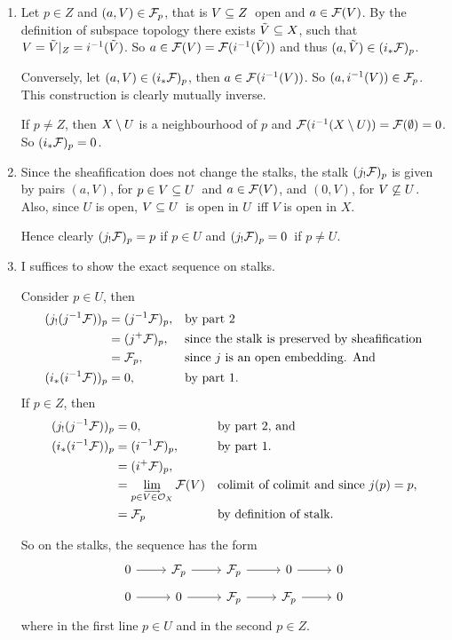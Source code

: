 \documentclass[a4paper,11pt,english]{article}
\begin{document}
\begin{exercise}[3]
\begin{enumerate}
\item 
Let $p \in Z$ and $(a,V) \in \mathcal{F}_p$, that is $V \subseteq Z$ open and $a \in \mathcal{F}(V)$. 
By the definition of subspace topology there exists $\tilde V\subseteq X$, such that 
$V = \tilde V|_Z = i^{-1}(\tilde V)$. So $a \in \mathcal{F}(V) = \mathcal{F}(i^{-1}(\tilde V))$ and thus
$(a, \tilde V) \in (i_*\mathcal{F})_p$. 

Conversely, let $(a,V) \in (i_*\mathcal{F})_p$, then $a \in \mathcal{F}(i^{-1}(V))$. So
$(a,i^{-1}(V)) \in \mathcal{F}_p$. This construction is clearly mutually inverse.

If $p \ne Z$, then $X\setminus U$ is a neighbourhood of $p$ and $\mathcal{F}(i^{-1}(X \setminus U)) =
\mathcal{F}(\emptyset) = 0$. So $(i_*\mathcal{F})_p = 0$.

\item 
Since the sheafification does not change the stalks, the stalk $(j_!\mathcal{F})_p$ is
given by pairs $(a,V)$, for $p \in V \subseteq U$ and $a \in \mathcal{F}(V)$, and $(0, V)$, for
$V \not\subseteq U$. Also, since $U$ is open, $V \subseteq U$ is open in $U$ iff $V$ is open
in $X$.

Hence clearly $(j_!\mathcal{F})_p = p$ if $p \in U$ and $(j_!\mathcal{F})_p = 0$ if $p \ne U$.

\item 
I suffices to show the exact sequence on stalks.

Consider $p \in U$, then 
\begin{align*}
(j_!(j\i\F))_p &= (j\i\F)_p, && \text{by part 2} \\
&= (j^+\F)_p, && \text{since the stalk is preserved by sheafification} \\
&= \F_p, &&\text{since } j \text{ is an open embedding. And}  \\
%
(i_*(i\i\F))_p &= 0, && \text{by part 1.}
\end{align*}
If $p \in Z$, then
\begin{align*}
(j_!(j\i\F))_p &= 0, && \text{by part 2, and} \\
(i_*(i\i\F))_p &= (i\i\F)_p, && \text{by part 1.} \\
&= (i^+\F)_p, \\
&= \colim_{p \in V \in \O_X} \F(V) && \text{colimit of colimit and since }
j(p) = p, \\
&= \F_p && \text{by definition of stalk.}
\end{align*}

So on the stalks, the sequence has the form 
\[ \begin{tikzcd}[row sep=.5em]
0 \arrow[r]& \F_p \arrow[r]& \F_p \arrow[r]& 0 \arrow[r]& 0 \\
0 \arrow[r]& 0 \arrow[r]& \F_p \arrow[r]& \F_p \arrow[r]& 0
\end{tikzcd} \]
where in the first line $p \in U$ and in the second $p \in Z$.


\end{enumerate}
\end{exercise}
\end{document}
